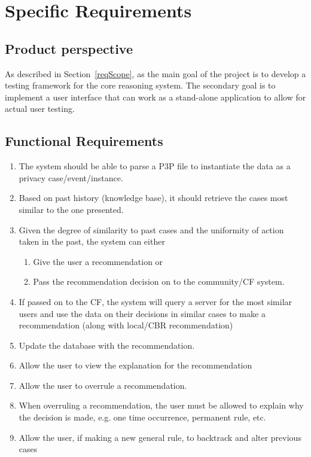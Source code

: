 \section{Specific Requirements}\label{specRec}

\subsection{Product perspective}
As described in Section~\ref{reqScope}, as the main goal of the project is to develop a testing framework for the core reasoning system. The secondary goal is to implement a user interface that can work as a stand-alone application to allow for actual user testing.

\subsection{Functional Requirements}
\begin{enumerate}

\item The system should be able to parse a P3P file to instantiate the data as a privacy case/event/instance.
\item Based on past history (knowledge base), it should retrieve the cases most similar to the one presented.
\item Given the degree of similarity to past cases and the uniformity of action taken in the past, the system can either 
  \begin{enumerate}
  \item Give the user a recommendation or 
  \item Pass the recommendation decision on to the community/CF system.
  \end{enumerate}
\item If passed on to the CF, the system will query a server for the most similar users and use the data on their decisions in similar cases to make a recommendation (along with local/CBR recommendation) 
\item Update the database with the recommendation.
\item Allow the user to view the explanation for the recommendation
\item Allow the user to overrule a recommendation. 
\item When overruling a recommendation, the user must be allowed to explain why the decision is made, e.g. one time occurrence, permanent rule, etc.	
\item Allow the user, if making a new general rule, to backtrack and alter previous cases
\end{enumerate}


